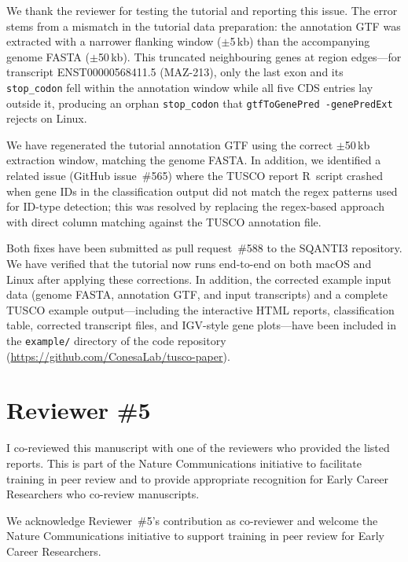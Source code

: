 \documentclass[11pt]{article}
\begin{document}
\begin{responseboxnew}
We thank the reviewer for testing the tutorial and reporting this issue. The error stems from a mismatch in the tutorial data preparation: the annotation GTF was extracted with a narrower flanking window ($\pm$5\,kb) than the accompanying genome FASTA ($\pm$50\,kb). This truncated neighbouring genes at region edges---for transcript ENST00000568411.5 (MAZ-213), only the last exon and its \texttt{stop\_codon} fell within the annotation window while all five CDS entries lay outside it, producing an orphan \texttt{stop\_codon} that \texttt{gtfToGenePred~-genePredExt} rejects on Linux.

We have regenerated the tutorial annotation GTF using the correct $\pm$50\,kb extraction window, matching the genome FASTA. In addition, we identified a related issue (GitHub issue~\#565) where the TUSCO report R~script crashed when gene IDs in the classification output did not match the regex patterns used for ID-type detection; this was resolved by replacing the regex-based approach with direct column matching against the TUSCO annotation file.

Both fixes have been submitted as pull request~\#588 to the SQANTI3 repository. We have verified that the tutorial now runs end-to-end on both macOS and Linux after applying these corrections. In addition, the corrected example input data (genome FASTA, annotation GTF, and input transcripts) and a complete TUSCO example output---including the interactive HTML reports, classification table, corrected transcript files, and IGV-style gene plots---have been included in the \texttt{example/} directory of the code repository (\url{https://github.com/ConesaLab/tusco-paper}).
\end{responseboxnew}

\section{Reviewer \#5}

\begin{positiveremarks}
I co-reviewed this manuscript with one of the reviewers who provided the listed reports. This is part of the Nature Communications initiative to facilitate training in peer review and to provide appropriate recognition for Early Career Researchers who co-review manuscripts.
\end{positiveremarks}

\begin{responseboxnew}
We acknowledge Reviewer~\#5's contribution as co-reviewer and welcome the Nature Communications initiative to support training in peer review for Early Career Researchers.
\end{responseboxnew}
\end{document}
